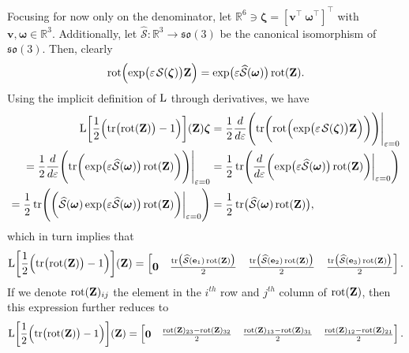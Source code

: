 Focusing for now only on the denominator, let $\mathbb{R}^6\ni\boldsymbol{\zeta} = [\mathbf{v}^\top\ \boldsymbol{\omega}^\top]^\top$ with $\mathbf{v}, \boldsymbol{\omega}\in\mathbb{R}^3$. Additionally, let $\widehat{\mathcal{S}}:\mathbb{R}^3\to\mathfrak{so}(3)$ be the canonical isomorphism of $\mathfrak{so}(3)$. Then, clearly
\begin{align}
    \rot\Bigl(\exp\bigl(\varepsilon\SL[\boldsymbol{\zeta}]\bigr)\mathbf{Z}\Bigr) = \exp\bigl(\varepsilon\widehat{\mathcal{S}}(\boldsymbol{\omega})\bigr)\rot(\mathbf{Z}). 
\end{align}
Using the implicit definition of $\operatorname{L}$ through derivatives, we have
\begin{align}
   \begin{split}
     \Lop\biggl[\frac{1}{2}\Bigl(\tr\bigl(\rot(\mathbf{Z})\bigr)-1\Bigr)\biggr](\mathbf{Z})\boldsymbol{\zeta} &= \frac{1}{2}\frac{d}{d\varepsilon}\Biggl(\tr\biggl(\rot\Bigl(\exp\bigl(\varepsilon\SL[\boldsymbol{\zeta}]\bigr)\mathbf{Z}\Bigr)\biggr)\Biggr)\Biggr|_{\varepsilon=0}\\
     = \frac{1}{2}\frac{d}{d\varepsilon}\Biggl(\tr\biggl(\exp\bigl(\varepsilon\widehat{\mathcal{S}}(\boldsymbol{\omega})\bigr)\rot(\mathbf{Z})\biggr)\Biggr)\Biggr|_{\varepsilon=0}
     &= \frac{1}{2}\tr\Biggl(\frac{d}{d\varepsilon}\biggl(\exp\bigl(\varepsilon\widehat{\mathcal{S}}(\boldsymbol{\omega})\bigr)\rot(\mathbf{Z})\biggr)\biggr|_{\varepsilon=0}\Biggr)\\
     = \frac{1}{2}\tr\Biggl(\biggl(\widehat{\mathcal{S}}(\boldsymbol{\omega})\exp\bigl(\varepsilon\widehat{\mathcal{S}}(\boldsymbol{\omega})\bigr)\rot(\mathbf{Z})\biggr)\biggr|_{\varepsilon=0}\Biggr)
     &= \frac{1}{2}\tr\bigl(\widehat{\mathcal{S}}(\boldsymbol{\omega})\rot(\mathbf{Z})\bigr),
   \end{split}
\end{align}
which in turn implies that 
\begin{align}
    \operatorname{L}\biggl[\frac{1}{2}\Bigl(\operatorname{tr}\bigl(\operatorname{rot}(\mathbf{Z})\bigr)-1\Bigr)\biggr](\mathbf{Z}) = \begin{bmatrix}
        \mathbf{0}& \frac{\operatorname{tr}\bigl(\widehat{\mathcal{S}}(\mathbf{e}_1)\operatorname{rot}(\mathbf{Z})\bigr)}{2} & \frac{\operatorname{tr}\bigl(\widehat{\mathcal{S}}(\mathbf{e}_2)\operatorname{rot}(\mathbf{Z})\bigr)}{2} & \frac{\operatorname{tr}\bigl(\widehat{\mathcal{S}}(\mathbf{e}_3)\operatorname{rot}(\mathbf{Z})\bigr)}{2}
    \end{bmatrix}.
\end{align}
If we denote $\operatorname{rot}(\mathbf{Z})_{ij}$ the element in the $i^{th}$ row and $j^{th}$ column of $\operatorname{rot}(\mathbf{Z})$, then this expression further reduces to
\begin{align}
    \operatorname{L}\biggl[\frac{1}{2}\Bigl(\operatorname{tr}\bigl(\operatorname{rot}(\mathbf{Z})\bigr)-1\Bigr)\biggr](\mathbf{Z}) = \begin{bmatrix}
        \mathbf{0}& \frac{\operatorname{rot}(\mathbf{Z})_{23}-\operatorname{rot}(\mathbf{Z})_{32}}{2} & \frac{\operatorname{rot}(\mathbf{Z})_{13} - \operatorname{rot}(\mathbf{Z})_{31}}{2} & \frac{\operatorname{rot}(\mathbf{Z})_{12}-\operatorname{rot}(\mathbf{Z})_{21}}{2}
    \end{bmatrix}.
\end{align}

